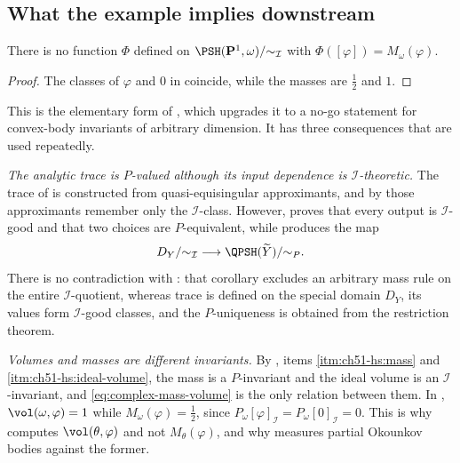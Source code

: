 \subsection{What the example implies downstream}
\label{sec:ch51-cantor-consequences}

\begin{corollary}
\label{cor:ch51-no-i-invariant-mass}
There is no function \(\Phi\) defined on
\(\PSH(\mathbf P^1,\omega)/{\sim_{\mathcal I}}\) with
\(\Phi([\varphi])=M_\omega(\varphi)\).
\end{corollary}

\begin{proof}
The classes of \(\varphi\) and \(0\) in
 coincide, while the masses are \(\tfrac12\) and
\(1\).
\end{proof}

This is the elementary form of , which
upgrades it to a no-go statement for convex-body invariants of arbitrary
dimension.  It has three consequences that are used repeatedly.

\emph{The analytic trace is \(P\)-valued although its input dependence is
\(\mathcal I\)-theoretic.}  The trace of
 is constructed from
quasi-equisingular approximants, and by
 those approximants remember only the
\(\mathcal I\)-class.  However,
 proves that every output is
\(\mathcal I\)-good and that two choices are \(P\)-equivalent, while
 produces the map
\[
 D_Y/{\sim_{\mathcal I}}
 \longrightarrow
 \QPSH(\widetilde Y)/{\sim_P}.
\]
There is no contradiction with :
that corollary excludes an arbitrary mass rule on the entire
\(\mathcal I\)-quotient, whereas trace is defined on the special domain
\(D_Y\), its values form \(\mathcal I\)-good classes, and the
\(P\)-uniqueness is obtained from the restriction theorem.

\emph{Volumes and masses are different invariants.}  By
, items \cref{itm:ch51-hs:mass} and
\cref{itm:ch51-hs:ideal-volume}, the mass is a \(P\)-invariant and the
ideal volume is an \(\mathcal I\)-invariant, and
\eqref{eq:complex-mass-volume} is the only relation between them.  In
, \(\vol(\omega,\varphi)=1\) while
\(M_\omega(\varphi)=\tfrac12\), since
\(P_\omega[\varphi]_{\mathcal I}=P_\omega[0]_{\mathcal I}=0\).  This is
why  computes
\(\vol(\theta,\varphi)\) and not \(M_\theta(\varphi)\), and why
 measures partial Okounkov bodies
against the former.

